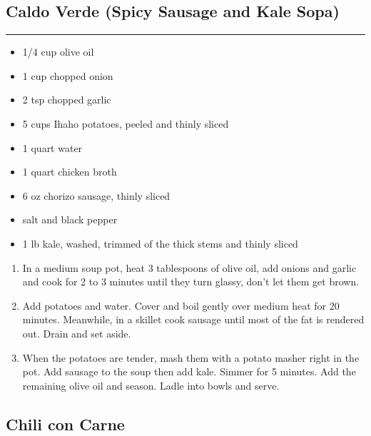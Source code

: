 \documentclass{article}
\begin{document}
\subsection{Caldo Verde (Spicy Sausage and Kale Sopa)} 
\noindent\rule[0.5ex]{\linewidth}{1pt}

\begin{framed}
    \begin{itemize}
        \item 1/4 cup olive oil
        \item 1 cup chopped onion
        \item 2 tsp chopped garlic
        \item 5 cups Ihaho potatoes, peeled and thinly sliced
        \item 1 quart water
        \item 1 quart chicken broth
        \item 6 oz chorizo sausage, thinly sliced
        \item salt and black pepper
        \item 1 lb kale, washed, trimmed of the thick stems and thinly sliced
    \end{itemize}
\end{framed}

\begin{enumerate}
    \item 
        In a medium soup pot, heat 3 tablespoons of olive oil, add onions and garlic and cook for 2 to 3 minutes until they turn glassy, don't let them get brown. 
    \item 
        Add potatoes and water. Cover and boil gently over medium heat for 20 minutes. Meanwhile, in a skillet cook sausage until most of the fat is rendered out. Drain and set aside. 
    \item 
        When the potatoes are tender, mash them with a potato masher right in the pot. Add sausage to the soup then add kale. Simmer for 5 minutes. Add the remaining olive oil and season. Ladle into bowls and serve.
\end{enumerate}
\newpage

\subsection{Chili con Carne} 
\end{document}
